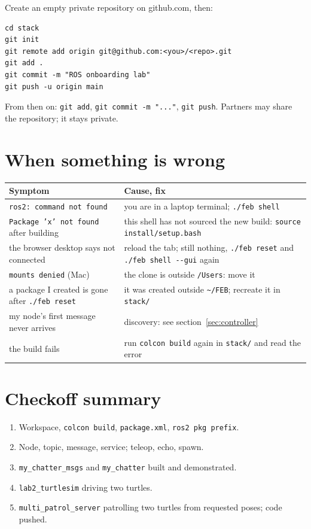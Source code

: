 \documentclass[11pt,a4paper]{article}
\begin{document}
Create an empty private repository on github.com, then:

\begin{lstlisting}
cd stack
git init
git remote add origin git@github.com:<you>/<repo>.git
git add .
git commit -m "ROS onboarding lab"
git push -u origin main
\end{lstlisting}

From then on: \texttt{git add}, \texttt{git commit -m "..."}, \texttt{git push}. Partners may
share the repository; it stays private.

\section{When something is wrong}

\noindent\begin{tabularx}{\linewidth}{lX}
\toprule
Symptom & Cause, fix \\
\midrule
\texttt{ros2: command not found} & you are in a laptop terminal; \texttt{./feb shell} \\
\texttt{Package 'x' not found} after building & this shell has not sourced the new build: \texttt{source install/setup.bash} \\
the browser desktop says not connected & reload the tab; still nothing, \texttt{./feb reset} and \texttt{./feb shell -{}-gui} again \\
\texttt{mounts denied} (Mac) & the clone is outside \texttt{/Users}: move it \\
a package I created is gone after \texttt{./feb reset} & it was created outside \texttt{\textasciitilde/FEB}; recreate it in \texttt{stack/} \\
my node's first message never arrives & discovery: see section~\ref{sec:controller} \\
the build fails & run \texttt{colcon build} again in \texttt{stack/} and read the error \\
\bottomrule
\end{tabularx}

\section*{Checkoff summary}

\begin{enumerate}
  \item Workspace, \texttt{colcon build}, \texttt{package.xml}, \texttt{ros2 pkg prefix}.
  \item Node, topic, message, service; teleop, echo, spawn.
  \item \texttt{my\_chatter\_msgs} and \texttt{my\_chatter} built and demonstrated.
  \item \texttt{lab2\_turtlesim} driving two turtles.
  \item \texttt{multi\_patrol\_server} patrolling two turtles from requested poses; code pushed.
\end{enumerate}
\end{document}
